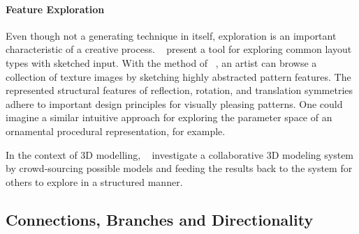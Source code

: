 \paragraph*{Feature Exploration}
\label{para:analysis_rulebased_exploration}

Even though not a generating technique in itself, exploration is an important characteristic of a creative process. \citeauthor*{todi_2016_sse}~\cite{todi_2016_sse} present a tool for exploring common layout types with sketched input. With the method of \citeauthor*{chen_2016_msi}~\cite{chen_2016_msi}, an artist can browse a collection of texture images by sketching highly abstracted pattern features. The represented structural features of reflection, rotation, and translation symmetries adhere to important design principles for visually pleasing patterns. One could imagine a similar intuitive approach for exploring the parameter space of an ornamental procedural representation, for example.

In the context of 3D modelling, \citeauthor*{talton_2009_emw}~\cite{talton_2009_emw} investigate a collaborative 3D modeling system by crowd-sourcing possible models and feeding the results back to the system for others to explore in a structured manner. 

\subsection{Connections, Branches and Directionality}
\label{subsec:analysis_connections_branches_and_directionality}

  

